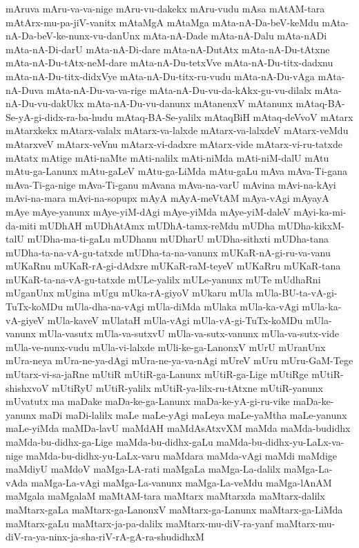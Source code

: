{mAruva
mAru-va-va-nige
mAru-vu-dakekx
mAru-vudu
mAsa
mAtAM-tara
mAtArx-mu-pa-jiV-vanitx
mAtaMgA
mAtaMga
mAta-nA-Da-beV-keMdu
mAta-nA-Da-beV-ke-nunx-vu-danUnx
mAta-nA-Dade
mAta-nA-Dalu
mAta-nADi
mAta-nA-Di-darU
mAta-nA-Di-dare
mAta-nA-DutAtx
mAta-nA-Du-tAtxne
mAta-nA-Du-tAtx-neM-dare
mAta-nA-Du-tetxVve
mAta-nA-Du-titx-dadxnu
mAta-nA-Du-titx-didxVye
mAta-nA-Du-titx-ru-vudu
mAta-nA-Du-vAga
mAta-nA-Duva
mAta-nA-Du-va-va-rige
mAta-nA-Du-vu-da-kAkx-gu-vu-dilalx
mAta-nA-Du-vu-dakUkx
mAta-nA-Du-vu-danunx
mAtanenxV
mAtanunx
mAtaq-BA-Se-yA-gi-didx-ra-ba-hudu
mAtaq-BA-Se-yalilx
mAtaqBiH
mAtaq-deVvoV
mAtarx
mAtarxkekx
mAtarx-valalx
mAtarx-va-lalxde
mAtarx-va-lalxdeV
mAtarx-veMdu
mAtarxveV
mAtarx-veVnu
mAtarx-vi-dadxre
mAtarx-vide
mAtarx-vi-ru-tatxde
mAtatx
mAtige
mAti-naMte
mAti-nalilx
mAti-niMda
mAti-niM-dalU
mAtu
mAtu-ga-Lanunx
mAtu-gaLeV
mAtu-ga-LiMda
mAtu-gaLu
mAva
mAva-Ti-gana
mAva-Ti-ga-nige
mAva-Ti-ganu
mAvana
mAva-na-varU
mAvina
mAvi-na-kAyi
mAvi-na-mara
mAvi-na-sopupx
mAyA
mAyA-meVtAM
mAya-vAgi
mAyayA
mAye
mAye-yanunx
mAye-yiM-dAgi
mAye-yiMda
mAye-yiM-daleV
mAyi-ka-mi-da-miti
mUDhAH
mUDhAtAmx
mUDhA-tamx-reMdu
mUDha
mUDha-kikxM-talU
mUDha-ma-ti-gaLu
mUDhanu
mUDharU
mUDha-sithxti
mUDha-tana
mUDha-ta-na-vA-gu-tatxde
mUDha-ta-na-vanunx
mUKaR-nA-gi-ru-va-vanu
mUKaRnu
mUKaR-rA-gi-dAdxre
mUKaR-raM-teyeV
mUKaRru
mUKaR-tana
mUKaR-ta-na-vA-gu-tatxde
mULe-yalilx
mULe-yanunx
mUTe
mUdhaRni
mUganUnx
mUgina
mUgu
mUka-rA-giyoV
mUkaru
mUla
mUla-BU-ta-vA-gi-TuTx-koMDu
mUla-dha-na-vAgi
mUla-diMda
mUlaka
mUla-ka-vAgi
mUla-ka-vA-giyeV
mUla-kaveV
mUlataH
mUla-vAgi
mUla-vA-gi-TuTx-koMDu
mUla-vanunx
mUla-vasutx
mUla-va-sutxvU
mUla-va-sutx-vanunx
mUla-va-sutx-vide
mUla-ve-nunx-vudu
mUla-vi-lalxde
mUli-ke-ga-LanonxV
mUrU
mUranUnx
mUra-neya
mUra-ne-ya-dAgi
mUra-ne-ya-va-nAgi
mUreV
mUru
mUru-GaM-Tege
mUtarx-vi-sa-jaRne
mUtiR
mUtiR-ga-Lanunx
mUtiR-ga-Lige
mUtiRge
mUtiR-shishxvoV
mUtiRyU
mUtiR-yalilx
mUtiR-ya-lilx-ru-tAtxne
mUtiR-yanunx
mUvatutx
ma
maDake
maDa-ke-ga-Lanunx
maDa-ke-yA-gi-ru-vike
maDa-ke-yanunx
maDi
maDi-lalilx
maLe
maLe-yAgi
maLeya
maLe-yaMtha
maLe-yanunx
maLe-yiMda
maMDa-lavU
maMdAH
maMdAsAtxvXM
maMda
maMda-budidhx
maMda-bu-didhx-ga-Lige
maMda-bu-didhx-gaLu
maMda-bu-didhx-yu-LaLx-va-nige
maMda-bu-didhx-yu-LaLx-varu
maMdara
maMda-vAgi
maMdi
maMdige
maMdiyU
maMdoV
maMga-LA-rati
maMgaLa
maMga-La-dalilx
maMga-La-vAda
maMga-La-vAgi
maMga-La-vanunx
maMga-La-veMdu
maMga-lAnAM
maMgala
maMgalaM
maMtAM-tara
maMtarx
maMtarxda
maMtarx-dalilx
maMtarx-gaLa
maMtarx-ga-LanonxV
maMtarx-ga-Lanunx
maMtarx-ga-LiMda
maMtarx-gaLu
maMtarx-ja-pa-dalilx
maMtarx-mu-diV-ra-yanf
maMtarx-mu-diV-ra-ya-ninx-ja-sha-riV-rA-gA-ra-shudidhxM
}
